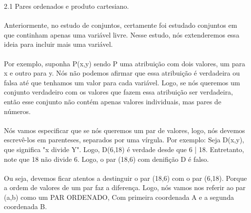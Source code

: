 
{\large 2.1 Pares ordenados e produto cartesiano.}
\\
\\


Anteriormente, no estudo de conjuntos, certamente foi estudado conjuntos em que continham apenas uma variável livre.
Nesse estudo, nós extenderemos essa ideia para incluir mais uma variável.
\\
\\
Por exemplo, suponha P(x,y) sendo P uma atribuição com dois valores, um para x e outro para y. Nós não podemos afirmar que essa
atribuição é verdadeira ou falsa até que tenhamos um valor para cada variável.
Logo, se nós queremos um conjunto verdadeiro com os valores que fazem essa atribuição ser verdadeira, então esse conjunto não 
contém apenas valores individuais, mas pares de números.
\\
\\
Nós vamos especificar que se nós queremos um par de valores, logo, nós devemos escrevê-los em parenteses, separados por uma 
vírgula. Por exemplo: Seja D(x,y), que significa "x divide Y". Logo, D(6,18) é verdade desde que 6 | 18. 
Entretanto, note que 18 não divide 6. Logo, o par (18,6) com denifição D é falso.
\\
\\
Ou seja, devemos ficar atentos a destinguir o par (18,6) com o par (6,18). Porque a ordem de valores de um par faz a diferença.
Logo, nós vamos nos referir ao par (a,b) como um PAR ORDENADO, Com primeira coordenada A e a segunda coordenada B.
